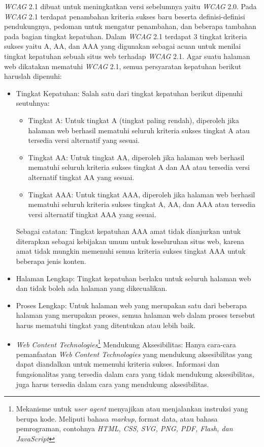 \textit{WCAG} 2.1 dibuat untuk meningkatkan versi sebelumnya yaitu \textit{WCAG} 2.0. Pada \textit{WCAG} 2.1 terdapat penambahan kriteria sukses baru beserta definisi-definisi pendukungnya, pedoman untuk mengatur penambahan, dan beberapa tambahan pada bagian tingkat kepatuhan. Dalam \textit{WCAG} 2.1 terdapat 3 tingkat kriteria sukses yaitu A, AA, dan AAA yang digunakan sebagai acuan untuk menilai tingkat kepatuhan sebuah situs web terhadap \textit{WCAG} 2.1. Agar suatu halaman web dikatakan mematuhi \textit{WCAG} 2.1, semua persyaratan kepatuhan berikut haruslah dipenuhi:
\begin{itemize}
	\item Tingkat Kepatuhan: Salah satu dari tingkat kepatuhan berikut dipenuhi seutuhnya:
	\begin{itemize}
		\item Tingkat A: Untuk tingkat A (tingkat paling rendah), diperoleh jika halaman web berhasil mematuhi seluruh kriteria sukses tingkat A atau tersedia versi alternatif yang sesuai.
		\item Tingkat AA: Untuk tingkat AA, diperoleh jika halaman web berhasil mematuhi seluruh kriteria sukses tingkat A dan AA atau tersedia versi alternatif tingkat AA yang sesuai.
		\item Tingkat AAA: Untuk tingkat AAA, diperoleh jika halaman web berhasil mematuhi seluruh kriteria sukses tingkat A, AA, dan AAA atau tersedia versi alternatif tingkat AAA yang sesuai.
	\end{itemize}
	Sebagai catatan: Tingkat kepatuhan AAA amat tidak dianjurkan untuk diterapkan sebagai kebijakan umum untuk keseluruhan situs web, karena amat tidak mungkin memenuhi semua kriteria sukses tingkat AAA untuk beberapa jenis konten.
	\item Halaman Lengkap: Tingkat kepatuhan berlaku untuk seluruh halaman web dan tidak boleh ada halaman yang dikecualikan.
	\item Proses Lengkap: Untuk halaman web yang merupakan satu dari beberapa halaman yang merupakan proses, semua halaman web dalam proses tersebut harus mematuhi tingkat yang ditentukan atau lebih baik.
	\item \textit{Web Content Technologies}\footnote{Mekanisme untuk \textit{user agent} menyajikan atau menjalankan instruksi yang berupa kode. Meliputi bahasa \textit{markup}, format data, atau bahasa pemrograman, contohnya \textit{HTML, CSS, SVG, PNG, PDF, Flash, dan JavaScript}} Mendukung Aksesibilitas: Hanya cara-cara pemanfaatan \textit{Web Content Technologies} yang mendukung aksesibilitas yang dapat diandalkan untuk memenuhi kriteria sukses. Informasi dan fungsionalitas yang tersedia dalam cara yang tidak mendukung aksesibilitas, juga harus tersedia dalam cara yang mendukung aksesibilitas.

\end{itemize}
